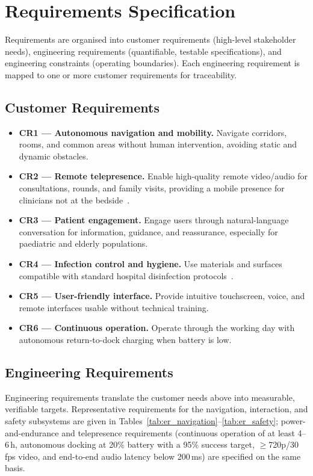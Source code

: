 \documentclass[11pt,a4paper]{article}
\begin{document}
\section{Requirements Specification}
\label{sec:requirements}

Requirements are organised into customer requirements (high-level stakeholder needs), engineering requirements (quantifiable, testable specifications), and engineering constraints (operating boundaries). Each engineering requirement is mapped to one or more customer requirements for traceability.

\subsection{Customer Requirements}
\begin{itemize}[leftmargin=*]
    \item \textbf{CR1 --- Autonomous navigation and mobility.} Navigate corridors, rooms, and common areas without human intervention, avoiding static and dynamic obstacles.
    \item \textbf{CR2 --- Remote telepresence.} Enable high-quality remote video/audio for consultations, rounds, and family visits, providing a mobile presence for clinicians not at the bedside~\cite{garingo2016}.
    \item \textbf{CR3 --- Patient engagement.} Engage users through natural-language conversation for information, guidance, and reassurance, especially for paediatric and elderly populations.
    \item \textbf{CR4 --- Infection control and hygiene.} Use materials and surfaces compatible with standard hospital disinfection protocols~\cite{intel2024,sciencedirect2021}.
    \item \textbf{CR5 --- User-friendly interface.} Provide intuitive touchscreen, voice, and remote interfaces usable without technical training.
    \item \textbf{CR6 --- Continuous operation.} Operate through the working day with autonomous return-to-dock charging when battery is low.
\end{itemize}

\subsection{Engineering Requirements}
Engineering requirements translate the customer needs above into measurable, verifiable targets. Representative requirements for the navigation, interaction, and safety subsystems are given in Tables~\ref{tab:er_navigation}--\ref{tab:er_safety}; power-and-endurance and telepresence requirements (continuous operation of at least 4--6\,h, autonomous docking at 20\% battery with a 95\% success target, $\geq$720p/30\,fps video, and end-to-end audio latency below 200\,ms) are specified on the same basis.
\end{document}

